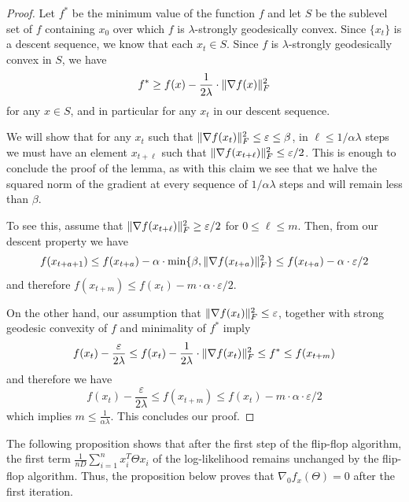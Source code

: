 \documentclass[aos]{imsart}
\theoremstyle{definition}
\numberwithin{equation}{section}
\DeclarePairedDelimiter{\norm}{\lVert}{\rVert}
\newcommand{\samp}{x}
\begin{document}
\begin{proof}
	Let $f^*$ be the minimum value of the function $f$ and let $S$ be the sublevel set of $f$ containing $x_0$ over which $f$ is $\lambda$-strongly geodesically convex. Since $\{x_t\}$ is a descent sequence, we know that each $x_t \in S$. Since $f$ is $\lambda$-strongly geodesically convex in $S$, we have
	$$ f^* \geq f(x) - \frac{1}{2\lambda} \cdot \norm{\nabla f(x)}_F^2 $$
	for any $x \in S$, and in particular for any $x_t$ in our descent sequence.

	 We will show that for any $x_t$ such that $\norm{\nabla f(x_t)}_F^2 \leq \varepsilon \leq \beta$, in $\ell \leq 1/\alpha \lambda$ steps we must have an element $x_{t+\ell}$ such that $\norm{\nabla f(x_{t + \ell})}_F^2 \leq \varepsilon/2$. This is enough to conclude the proof of the lemma, as with this claim we see that we halve the squared norm of the gradient at every sequence of $1/\alpha \lambda$ steps and will remain less than $\beta$.

	To see this, assume that $\norm{\nabla f(x_{t+\ell})}_F^2 \geq \varepsilon/2$ for $0 \leq \ell \leq m$. 
	Then, from our descent property we have
	$$ f(x_{t+a+1}) \leq f(x_{t+a}) - \alpha \cdot \min\{\beta,  \norm{\nabla f(x_{t+a})}^2_F \} \leq f(x_{t+a}) - \alpha \cdot \varepsilon/2$$
	and therefore $f(x_{t + m}) \leq f(x_t) - m \cdot \alpha \cdot \varepsilon/2$.

	On the other hand, our assumption that $\norm{\nabla f(x_t)}_F^2 \leq \varepsilon$, together with strong geodesic convexity of $f$ and minimality of $f^*$ imply
	$$ f(x_t) - \frac{\varepsilon}{2\lambda} \leq f(x_t) - \frac{1}{2\lambda} \cdot \norm{\nabla f(x_t)}_F^2 \leq f^* \leq f(x_{t+m}) $$
	and therefore we have
	$$ f(x_t) - \frac{\varepsilon}{2\lambda} \leq f(x_{t + m}) \leq f(x_t) - m \cdot \alpha \cdot \varepsilon/2 $$
	which implies $m \leq \frac{1}{\alpha \lambda}$. This concludes our proof.
\end{proof}

The following proposition shows that after the first step of the flip-flop algorithm, the first term $\frac{1}{nD}\sum_{i = 1}^n \samp_i^T \Theta \samp_i$ of the log-likelihood remains unchanged by the flip-flop algorithm.
Thus, the proposition below proves that $\nabla_0 f_x(\Theta) = 0$ after the first iteration. %
\end{document}
